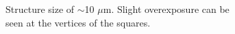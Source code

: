 \begin{figure}[ht]
    \begin{subfigure}[t]{0.3\linewidth}
	\centering
	\caption{Structure size of $\sim$10 $\mu$m. Slight overexposure can be seen at the vertices of the squares.}
	\label{fig:b2d7_q7}
\end{subfigure}
\\
\vspace*{1.5mm}
    \begin{subfigure}[t]{0.3\linewidth}
	\centering

\end{subfigure}
\end{figure}
